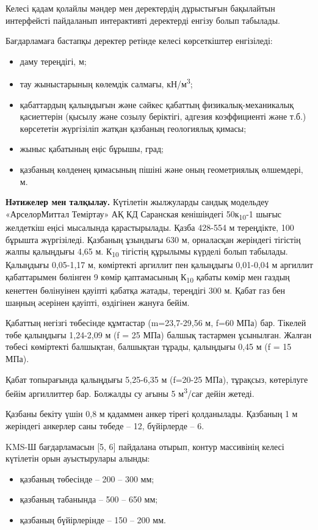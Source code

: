 Келесі қадам қолайлы мәндер мен деректердің дұрыстығын бақылайтын
интерфейсті пайдаланып интерактивті деректерді енгізу болып табылады.

Бағдарламаға бастапқы деректер ретінде келесі көрсеткіштер енгізіледі:

\begin{itemize}
\item
  даму тереңдігі, м;
\item
  тау жыныстарының көлемдік салмағы, кН/м\textsuperscript{3};
\item
  қабаттардың қалыңдығын және сәйкес қабаттың физикалық-механикалық
  қасиеттерін (қысылу және созылу беріктігі, адгезия коэффициенті және
  т.б.) көрсететін жүргізіліп жатқан қазбаның геологиялық қимасы;
\item
  жыныс қабатының еңіс бұрышы, град;
\item
  қазбаның көлденең қимасының пішіні және оның геометриялық өлшемдері,
  м.
\end{itemize}

{\bfseries Нәтижелер мен талқылау.} Күтілетін жылжуларды сандық модельдеу
«АрселорМиттал Теміртау» АҚ КД Саранская кенішіндегі
50к\textsubscript{10}-1 шығыс желдеткіш еңісі мысалында қарастырылады.
Қазба 428-554 м тереңдікте, 100 бұрышта жүргізіледі. Қазбаның ұзындығы
630 м, орналасқан жеріндегі тігістің жалпы қалыңдығы 4,65 м.
К\textsubscript{10} тігістің құрылымы күрделі болып табылады. Қалыңдығы
0,05-1,17 м, көміртекті аргиллит пен қалыңдығы 0,01-0,04 м аргиллит
қабаттарымен бөлінген 9 көмір қаптамасының К\textsubscript{10} қабаты
көмір мен газдың кенеттен бөлінуінен қауіпті қабатқа жатады, тереңдігі
300 м. Қабат газ бен шаңның әсерінен қауіпті, өздігінен жануға бейім.

Қабаттың негізгі төбесінде құмтастар (m=23,7-29,56 м, f=60 МПа) бар.
Тікелей төбе қалыңдығы 1,24-2,09 м (f = 25 МПа) балшық тастармен
ұсынылған. Жалған төбесі көміртекті балшықтан, балшықтан тұрады,
қалыңдығы 0,45 м (f = 15 МПа).

Қабат топырағында қалыңдығы 5,25-6,35 м (f=20-25 МПа), тұрақсыз,
көтерілуге бейім аргиллиттер бар. Болжалды су ағыны 5
м\textsuperscript{3}/сағ дейін жетеді.

Қазбаны бекіту үшін 0,8 м қадаммен анкер тірегі қолданылады. Қазбаның 1
м жеріндегі анкерлер саны төбеде -- 12, бүйірлерде -- 6.

KMS-Ш бағдарламасын {[}5, 6{]} пайдалана отырып, контур массивінің
келесі күтілетін орын ауыстырулары алынды:

\begin{itemize}
\item
  қазбаның төбесінде -- 200 -- 300 мм;
\item
  қазбаның табанында -- 500 -- 650 мм;
\item
  қазбаның бүйірлерінде -- 150 -- 200 мм.
\end{itemize}

